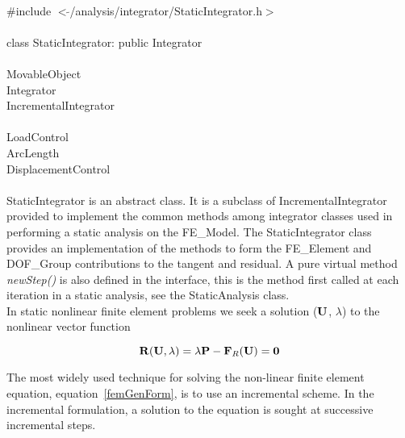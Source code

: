 
   \\
\indent \#include $<\tilde{ }$/analysis/integrator/StaticIntegrator.h$>$  \\

  \\
\indent class StaticIntegrator: public Integrator  \\

 \\
\indent MovableObject \\
\indent\indent Integrator \\
\indent\indent\indent IncrementalIntegrator \\
\indent\indent\indent{} \\
\indent\indent\indent\indent\indent LoadControl \\
\indent\indent\indent\indent\indent ArcLength \\
\indent\indent\indent\indent\indent DisplacementControl \\

 \\ 
\indent StaticIntegrator is an abstract class. It is a subclass of
IncrementalIntegrator provided to implement the common methods among
integrator classes used in performing a static analysis on the
FE\_Model. The StaticIntegrator class provides an implementation of
the methods to form the FE\_Element and DOF\_Group contributions to
the tangent and residual. A pure virtual method {\em newStep()} is
also defined in the interface, this is the method first called at each
iteration in a static analysis, see the StaticAnalysis class. \\

In static nonlinear finite element problems we seek a solution
(${\bf U}$, $\lambda$) to the nonlinear vector function

\begin{equation}
{\bf R}({\bf U}, \lambda) = \lambda {\bf P} - {\bf F}_R({\bf U}) = {\bf 0}
\label{staticGenForm}
\end{equation}

The most widely used technique for solving the non-linear finite
element equation, equation~\ref{femGenForm}, is to use an incremental
scheme. In the incremental formulation, a solution to the equation is
sought at successive incremental steps.  


